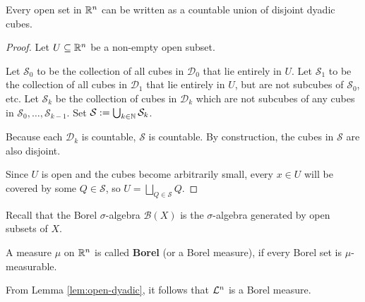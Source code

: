 \begin{lem}[] \label{lem:open-dyadic}
  Every open set in $\mathbb{R}^{n}$ can be written as a countable union of disjoint dyadic cubes.
\end{lem}
\begin{proof}
Let $U \subseteq \mathbb{R}^{n}$ be a non-empty open subset.

Let $\mathcal{S}_0$ to be the collection of all cubes in $\mathcal{D}_0$ that lie entirely in $U$.
Let $\mathcal{S}_1$ to be the collection of all cubes in $\mathcal{D}_1$ that lie entirely in $U$, but are not subcubes of $\mathcal{S}_0$, etc.
Let $\mathcal{S}_k$ be the collection of cubes in $\mathcal{D}_k$ which are not subcubes of any cubes in $\mathcal{S}_0, \ldots, \mathcal{S}_{k-1}$.
Set $\mathcal{S} := \bigcup_{k \in \mathbb{N}}\mathcal{S}_k$.

Because each $\mathcal{D}_k$ is countable, $\mathcal{S}$ is countable.
By construction, the cubes in $\mathcal{S}$ are also disjoint.

Since $U$ is open and the cubes become arbitrarily small, every $x \in U$ will be covered by some $Q \in \mathcal{S}$, so $U = \bigsqcup_{Q \in \mathcal{S}}Q$.

\end{proof}

Recall that the Borel $\sigma$-algebra $\mathcal{B}(X)$ is the $\sigma$-algebra generated by open subsets of $X$.

\begin{dfn}[]
  A measure $\mu$ on $\mathbb{R}^{n}$ is called \textbf{Borel} (or a Borel measure), if every Borel set is $\mu$-measurable.
\end{dfn}

\begin{rem}[] \label{rem:leb-is-borel}
  From Lemma \ref{lem:open-dyadic}, it follows that $\mathcal{L}^{n}$ is a Borel measure.
\end{rem}
